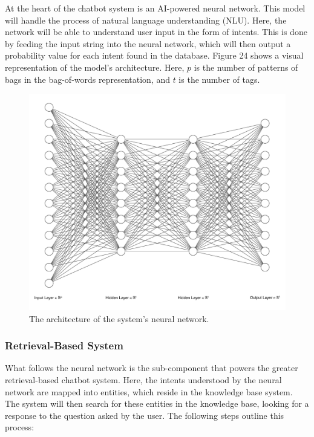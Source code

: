 \documentclass[titlepage, 12pt]{article}
\begin{document}
At the heart of the chatbot system is an AI-powered neural network. This model will handle the process of natural language understanding (NLU). Here, the network will be able to understand user input in the form of intents. This is done by feeding the input string into the neural network, which will then output a probability value for each intent found in the database. Figure 24 shows a visual representation of the model’s architecture. Here, $p$ is the number of patterns of bags in the bag-of-words representation, and $t$ is the number of tags.

\begin{figure}[h!]
    \centering\includegraphics[width=0.875\linewidth]{images/nn-architecture.png}
    \caption{The architecture of the system's neural network.}
\end{figure}

\subsubsection{Retrieval-Based System}

What follows the neural network is the sub-component that powers the greater retrieval-based chatbot system. Here, the intents understood by the neural network are mapped into entities, which reside in the knowledge base system. The system will then search for these entities in the knowledge base, looking for a response to the question asked by the user. The following steps outline this process:
\end{document}
